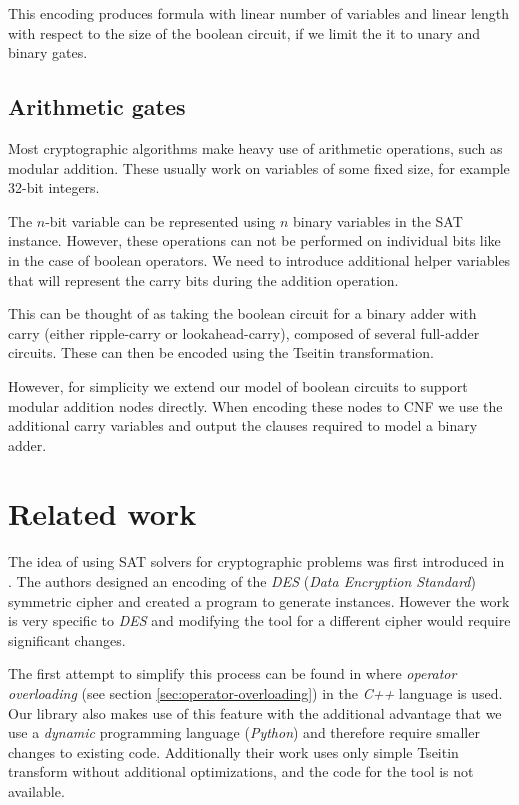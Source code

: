 This encoding produces formula with linear number of variables and linear length with respect to the size of the boolean circuit, if we limit the it to unary and binary gates.

\subsection{Arithmetic gates}
Most cryptographic algorithms make heavy use of arithmetic operations, such as modular addition.
These usually work on variables of some fixed size, for example 32-bit integers.

The $n$-bit variable can be represented using $n$ binary variables in the SAT instance.
However, these operations can not be performed on individual bits like in the case of boolean operators.
We need to introduce additional helper variables that will represent the carry bits during the addition operation.

This can be thought of as taking the boolean circuit for a binary adder with carry (either ripple-carry or lookahead-carry), composed of several full-adder circuits.
These can then be encoded using the Tseitin transformation.

However, for simplicity we extend our model of boolean circuits to support modular addition nodes directly.
When encoding these nodes to CNF we use the additional carry variables and output the clauses required to model a binary adder.

\section{Related work}
\label{sec:related-work}
The idea of using SAT solvers for cryptographic problems was first introduced in \cite{massacci2000logical}.
The authors designed an encoding of the \emph{DES} (\emph{Data Encryption Standard}) symmetric cipher and created a program to generate instances.
However the work is very specific to \emph{DES} and modifying the tool for a different cipher would require significant changes.

The first attempt to simplify this process can be found in \cite{jovanovic2005logical} where \emph{operator overloading} (see section \ref{sec:operator-overloading}) in the \emph{C++} language is used.
Our library also makes use of this feature with the additional advantage that we use a \emph{dynamic} programming language (\emph{Python}) and therefore require smaller changes to existing code.
Additionally their work uses only simple Tseitin transform without additional optimizations, and the code for the tool is not available.


